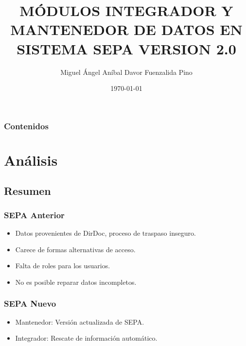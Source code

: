 \documentclass{beamer}
\title[SEPA 2.0]{MÓDULOS INTEGRADOR Y MANTENEDOR DE DATOS EN SISTEMA SEPA VERSION 2.0} %
\author{Miguel Ángel Aníbal Davor Fuenzalida Pino} %
\institute[UTEM] %
{
UNIVERSIDAD TECNOLÓGICA METROPOLITANA \\ %
\medskip
\textit{anibaldavor@gmail.com} %
}
\date{\today} %
\begin{document}
\begin{frame}
\titlepage %
\end{frame}

\begin{frame}
\frametitle{Contenidos} %
\tableofcontents %
\end{frame}


\section{Análisis}

\subsection{Resumen}

\begin{frame}
\frametitle{SEPA Anterior}
\begin{itemize}
\item Datos provenientes de DirDoc, proceso de traspaso inseguro.
\item Carece de formas alternativas de acceso.
\item Falta de roles para los usuarios.
\item No es posible reparar datos incompletos.
\end{itemize}
\end{frame}


\begin{frame}
\frametitle{SEPA Nuevo}
\begin{itemize}
\item Mantenedor: Versión actualizada de SEPA.
\item Integrador: Rescate de información automático.
\end{itemize}
\end{frame}
\end{document}
